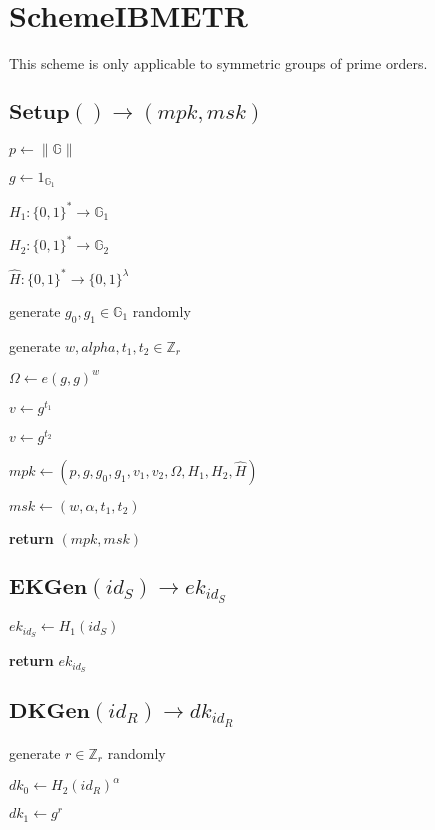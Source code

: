 \documentclass[a4paper]{article}
\begin{document}
\section{SchemeIBMETR}

This scheme is only applicable to symmetric groups of prime orders. 

\subsection{$\textbf{Setup}() \rightarrow (\textit{mpk}, \textit{msk})$}

$p \gets \|\mathbb{G}\|$

$g \gets 1_{\mathbb{G}_1}$

$H_1:\{0, 1\}^* \rightarrow \mathbb{G}_1$

$H_2:\{0, 1\}^* \rightarrow \mathbb{G}_2$

$\hat{H}: \{0, 1\}^* \rightarrow \{0, 1\}^\lambda$

generate $g_0, g_1 \in \mathbb{G}_1$ randomly

generate $w, alpha, t_1, t_2 \in \mathbb{Z}_r$

$\Omega \gets e(g, g)^w$

$v \gets g^{t_1}$

$v \gets g^{t_2}$

$\textit{mpk} \gets (p, g, g_0, g_1, v_1, v_2, \Omega, H_1, H_2, \hat{H})$

$\textit{msk} \gets (w, \alpha, t_1, t_2)$

\textbf{return} $(\textit{mpk}, \textit{msk})$

\subsection{$\textbf{EKGen}(\textit{id}_S) \rightarrow \textit{ek}_{\textit{id}_S}$}

$\textit{ek}_{\textit{id}_S} \gets H_1(\textit{id}_S)$

\textbf{return} $\textit{ek}_{\textit{id}_S}$

\subsection{$\textbf{DKGen}(\textit{id}_R) \rightarrow \textit{dk}_{\textit{id}_R}$}

generate $r \in \mathbb{Z}_r$ randomly

$\textit{dk}_0 \gets H_2(\textit{id}_R)^\alpha$

$\textit{dk}_1 \gets g^r$
\end{document}
